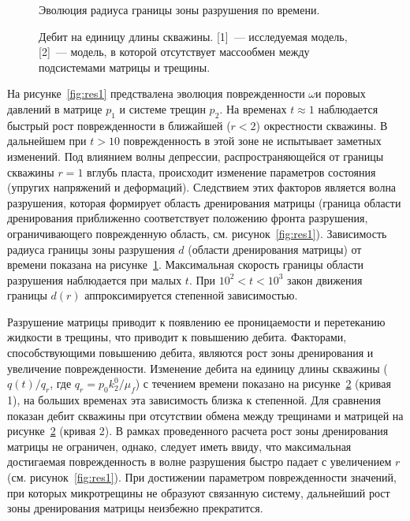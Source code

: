 \begin{figure}[ht]
  \caption{Эволюция радиуса границы зоны разрушения по времени.}
  \label{fig:res2}
\end{figure}

\begin{figure}[ht]
  \caption{Дебит на единицу длины скважины. [1]~--- исследуемая модель, [2]~--- модель, в которой отсутствует массообмен между подсистемами матрицы и трещины.}
  \label{fig:res3}
\end{figure}

На рисунке~\ref{fig:res1} предствалена эволюция поврежденности $\omega$и поровых давлений в матрице $p_1$ и системе трещин $p_2$. На временах $t \approx 1$ наблюдается быстрый рост поврежденности в ближайшей ($r < 2$) окрестности скважины.  В дальнейшем при $t > 10$ поврежденность в этой зоне не испытывает заметных изменений. Под влиянием волны депрессии, распространяющейся от границы скважины $r = 1$ вглубь пласта, происходит изменение параметров состояния (упругих напряжений и деформаций). Следствием этих факторов является волна разрушения, которая формирует область дренирования матрицы (граница области дренирования приближенно соответствует положению фронта разрушения, ограничивающего поврежденную область, см. рисунок~\ref{fig:res1}). Зависимость радиуса границы зоны разрушения $d$ (области дренирования матрицы) от времени показана на рисунке~\ref{fig:res2}. Максимальная скорость границы области разрушения наблюдается при малых $t$. При $10^2 < t < 10^3$ закон движения границы $d(r)$ аппроксимируется степенной зависимостью.

Разрушение матрицы приводит к появлению ее проницаемости и перетеканию жидкости в трещины, что приводит к повышению дебита. Факторами, способствующими повышению дебита, являются рост зоны дренирования и увеличение поврежденности. Изменение дебита на единицу длины скважины ($q(t)/q_r$, где $q_r = p_0 k_2^0 / \mu_f$) с течением времени показано на рисунке~\ref{fig:res3} (кривая 1), на больших временах эта зависимость близка к степенной. Для сравнения показан дебит скважины при отсутствии обмена между трещинами и матрицей на рисунке~\ref{fig:res3} (кривая 2). В рамках проведенного расчета рост зоны дренирования матрицы не ограничен,  однако, следует иметь ввиду, что максимальная достигаемая поврежденность в волне разрушения быстро падает с увеличением $r$ (см. рисунок~\ref{fig:res1}). При достижении параметром поврежденности значений, при которых микротрещины не образуют связанную систему, дальнейший рост зоны дренирования матрицы неизбежно прекратится.

